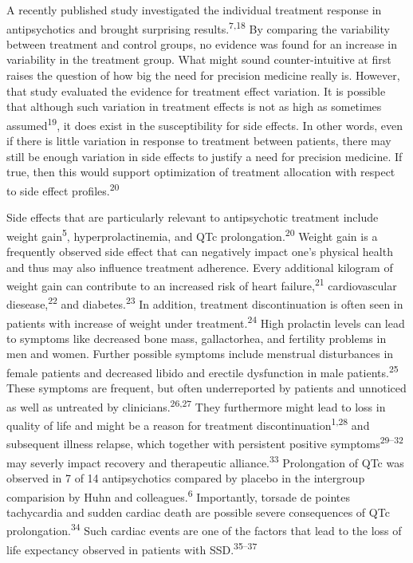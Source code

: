 \documentclass[9pt,english,,jou,floatsintext]{apa6}
\begin{document}
A recently published study investigated the individual treatment
response in antipsychotics and brought surprising
results.\textsuperscript{7,18} By comparing the variability between
treatment and control groups, no evidence was found for an increase in
variability in the treatment group. What might sound counter-intuitive
at first raises the question of how big the need for precision medicine
really is. However, that study evaluated the evidence for treatment
effect variation. It is possible that although such variation in
treatment effects is not as high as sometimes
assumed\textsuperscript{19}, it does exist in the susceptibility for
side effects. In other words, even if there is little variation in
response to treatment between patients, there may still be enough
variation in side effects to justify a need for precision medicine. If
true, then this would support optimization of treatment allocation with
respect to side effect profiles.\textsuperscript{20}

Side effects that are particularly relevant to antipsychotic treatment
include weight gain\textsuperscript{5}, hyperprolactinemia, and QTc
prolongation.\textsuperscript{20} Weight gain is a frequently observed
side effect that can negatively impact one's physical health and thus
may also influence treatment adherence. Every additional kilogram of
weight gain can contribute to an increased risk of heart
failure,\textsuperscript{21} cardiovascular
diesease,\textsuperscript{22} and diabetes.\textsuperscript{23} In
addition, treatment discontinuation is often seen in patients with
increase of weight under treatment.\textsuperscript{24} High prolactin
levels can lead to symptoms like decreased bone mass, gallactorhea, and
fertility problems in men and women. Further possible symptoms include
menstrual disturbances in female patients and decreased libido and
erectile dysfunction in male patients.\textsuperscript{25} These
symptoms are frequent, but often underreported by patients and unnoticed
as well as untreated by clinicians.\textsuperscript{26,27} They
furthermore might lead to loss in quality of life and might be a reason
for treatment discontinuation\textsuperscript{1,28} and subsequent
illness relapse, which together with persistent positive
symptoms\textsuperscript{29--32} may severly impact recovery and
therapeutic alliance.\textsuperscript{33} Prolongation of QTc was
observed in 7 of 14 antipsychotics compared by placebo in the intergroup
comparision by Huhn and colleagues.\textsuperscript{6} Importantly,
torsade de pointes tachycardia and sudden cardiac death are possible
severe consequences of QTc prolongation.\textsuperscript{34} Such
cardiac events are one of the factors that lead to the loss of life
expectancy observed in patients with SSD.\textsuperscript{35--37}
\end{document}
